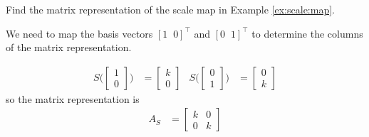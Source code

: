 \phantom{hi}

\begin{example} \label{ex:scale:map:matrix:rep}
Find the matrix representation of the scale map in Example \ref{ex:scale:map}. 

\solution

We need to map the basis vectors $[1\;\;0]^{\intercal}$ and $[0\;\;1]^{\intercal}$ to determine the columns of the matrix representation. 

\begin{align*}
S \biggl(\begin{bmatrix}
1 \\ 0 
\end{bmatrix} \biggr) & = \begin{bmatrix}
k \\ 0 
\end{bmatrix} & S\biggl( \begin{bmatrix}
0 \\ 1 
\end{bmatrix} \biggr) & = \begin{bmatrix}
0 \\ k 
\end{bmatrix}
\end{align*}
so the matrix representation is
%
\begin{align*}
A_S & = \begin{bmatrix}
k & 0 \\
0 & k 
\end{bmatrix}
\end{align*}
\end{example}

\phantom{hi}

